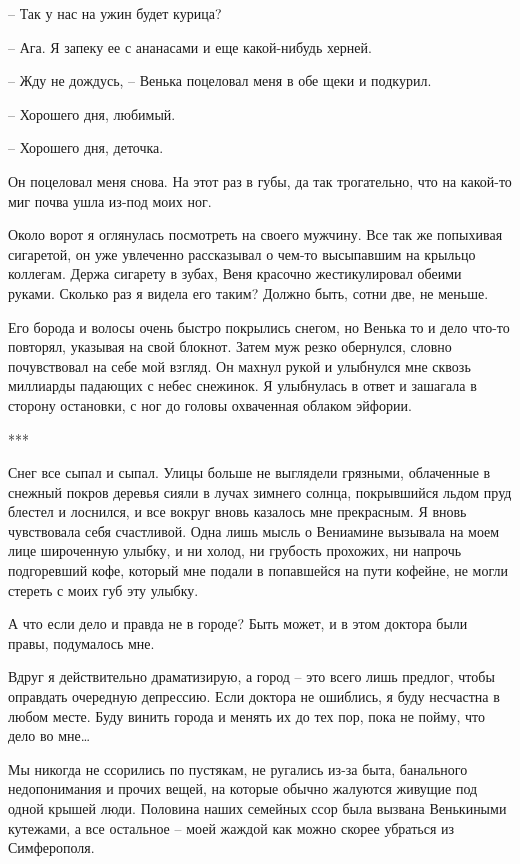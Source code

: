 \documentclass[
]{book}
\begin{document}
-- Так у нас на ужин будет курица?

-- Ага. Я запеку ее с ананасами и еще какой-нибудь херней.

-- Жду не дождусь, -- Венька поцеловал меня в обе щеки и подкурил.

-- Хорошего дня, любимый.

-- Хорошего дня, деточка.

Он поцеловал меня снова. На этот раз в губы, да так трогательно, что на какой-то миг почва ушла из-под моих ног.

Около ворот я оглянулась посмотреть на своего мужчину. Все так же попыхивая сигаретой, он уже увлеченно рассказывал о чем-то высыпавшим на крыльцо коллегам. Держа сигарету в зубах, Веня красочно жестикулировал обеими руками. Сколько раз я видела его таким? Должно быть, сотни две, не меньше.

Его борода и волосы очень быстро покрылись снегом, но Венька то и дело что-то повторял, указывая на свой блокнот. Затем муж резко обернулся, словно почувствовал на себе мой взгляд. Он махнул рукой и улыбнулся мне сквозь миллиарды падающих с небес снежинок. Я улыбнулась в ответ и зашагала в сторону остановки, с ног до головы охваченная облаком эйфории.

***

Снег все сыпал и сыпал. Улицы больше не выглядели грязными, облаченные в снежный покров деревья сияли в лучах зимнего солнца, покрывшийся льдом пруд блестел и лоснился, и все вокруг вновь казалось мне прекрасным. Я вновь чувствовала себя счастливой. Одна лишь мысль о Вениамине вызывала на моем лице широченную улыбку, и ни холод, ни грубость прохожих, ни напрочь подгоревший кофе, который мне подали в попавшейся на пути кофейне, не могли стереть с моих губ эту улыбку.

А что если дело и правда не в городе? Быть может, и в этом доктора были правы, подумалось мне.

Вдруг я действительно драматизирую, а город -- это всего лишь предлог, чтобы оправдать очередную депрессию. Если доктора не ошиблись, я буду несчастна в любом месте. Буду винить города и менять их до тех пор, пока не пойму, что дело во мне\ldots{}

Мы никогда не ссорились по пустякам, не ругались из-за быта, банального недопонимания и прочих вещей, на которые обычно жалуются живущие под одной крышей люди. Половина наших семейных ссор была вызвана Венькиными кутежами, а все остальное -- моей жаждой как можно скорее убраться из Симферополя.
\end{document}
